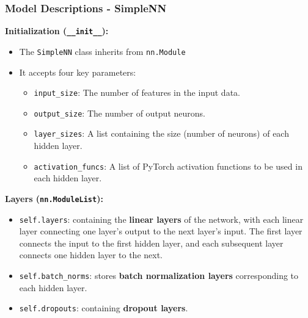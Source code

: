 \documentclass[10pt]{beamer}
\begin{document}
\begin{frame}
\frametitle{Model Descriptions - SimpleNN}
\textbf{Initialization (\texttt{\_\_init\_\_}):}
\begin{itemize}
\item The \texttt{SimpleNN} class inherits from \texttt{nn.Module}
\item It accepts four key parameters:
\begin{itemize}
\item \texttt{input\_size}: The number of features in the input data.
\item \texttt{output\_size}: The number of output neurons.
\item \texttt{layer\_sizes}: A list containing the size (number of neurons) of each hidden layer.
\item \texttt{activation\_funcs}: A list of PyTorch activation functions to be used in each hidden layer.
\end{itemize}
\end{itemize}

\textbf{Layers (\texttt{nn.ModuleList}):}
\begin{itemize}
\item \texttt{self.layers}: containing the \textbf{linear layers} of the network, with each linear layer connecting one layer's output to the next layer's input. The first layer connects the input to the first hidden layer, and each subsequent layer connects one hidden layer to the next.
\item \texttt{self.batch\_norms}: stores \textbf{batch normalization layers} corresponding to each hidden layer.
\item \texttt{self.dropouts}: containing \textbf{dropout layers}.
\end{itemize}
\end{frame}
\end{document}
